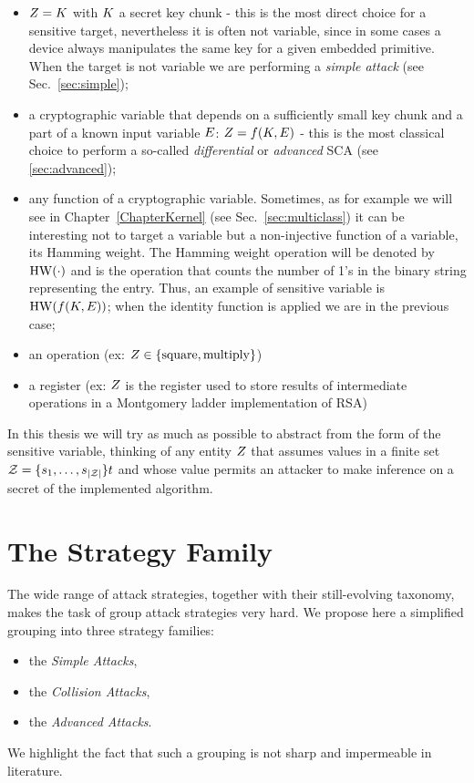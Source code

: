 \begin{itemize}
\item $Z = K$ with $K$ a secret key chunk - this is the most direct choice for a sensitive target, nevertheless it is often not variable, since in some cases a device always manipulates the same key for a given embedded primitive. When the target is not variable we are performing a \emph{simple attack} (see Sec.~\ref{sec:simple});
\item a cryptographic variable that depends on a sufficiently small key chunk and a part of a known input variable $E$: $Z = f(K,E)$ - this is the most classical choice to perform a so-called \emph{differential} or \emph{advanced} SCA (see \ref{sec:advanced});
\item any function of a cryptographic variable. Sometimes, as for example we will see in Chapter~\ref{ChapterKernel} (see Sec.~\ref{sec:multiclass}) it can be interesting not to target a variable but a non-injective function of a variable, \eg its Hamming weight. The Hamming weight operation will be denoted by $\mathrm{HW}(\cdot)$ and is the operation that counts the number of 1's in the binary string representing the entry. Thus, an example of sensitive variable is $\mathrm{HW}(f(K,E))$; when the identity function is applied we are in the previous case;
\item an operation (ex: $Z \in \{\mathrm{square}, \mathrm{multiply}\}$)
\item a register (ex: $Z$ is the register used to store results of intermediate operations in a Montgomery ladder implementation of RSA)
\end{itemize}
In this thesis we will try as much as possible to abstract from the form of the sensitive variable, thinking of any entity $Z$ that assumes values in a finite set $\mathcal{Z}=\{s_{1}, \dots, s_{\lvert\mathcal{Z}\rvert}\}t$ and whose value permits an attacker to make inference on a secret of the implemented algorithm.

\section{The Strategy Family}\label{sec:strategies}
The wide range of attack strategies, together with their still-evolving taxonomy, makes the task of group attack strategies very hard. We propose here a simplified grouping into three strategy families: 
\begin{itemize}
\item  the \emph{Simple Attacks},
\item the \emph{Collision Attacks}, 
\item the \emph{Advanced Attacks}.
\end{itemize}  
We highlight the fact that such a grouping is not sharp and impermeable in literature. 


